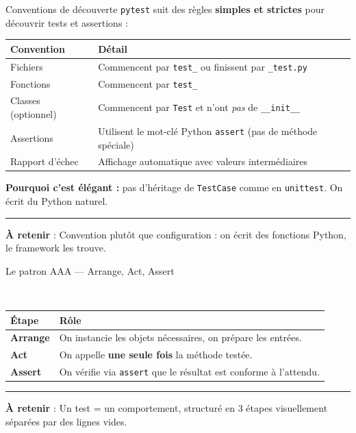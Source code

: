 \documentclass[aspectratio=169,11pt]{beamer}
\newcommand{\takeaway}[1]{%
\vfill\begin{beamercolorbox}[wd=\linewidth,sep=0.4em]{}
\color{accent2}\rule[0.6ex]{1.2em}{1.2pt}\hspace{0.4em}%
\textbf{\color{accent2}\small À retenir} \textcolor{textsoft}{:} %
{\small\color{textmain}#1}
\end{beamercolorbox}}
\begin{document}
\begin{frame}[t]{Conventions de découverte}
\footnotesize
\texttt{pytest} suit des règles \textbf{simples et strictes} pour découvrir tests et assertions :\\[0.3em]
\begin{tabular}{@{}p{4.4cm} p{8cm}@{}}
\toprule
\textbf{\color{accent}Convention} & \textbf{\color{accent}Détail} \\
\midrule
Fichiers & Commencent par \texttt{test\_} ou finissent par \texttt{\_test.py} \\
Fonctions & Commencent par \texttt{test\_} \\
Classes (optionnel) & Commencent par \texttt{Test} et n'ont \emph{pas} de \texttt{\_\_init\_\_} \\
Assertions & Utilisent le mot-clé Python \texttt{assert} (pas de méthode spéciale) \\
Rapport d'échec & Affichage automatique avec valeurs intermédiaires \\
\bottomrule
\end{tabular}
\vspace{0.4cm}
\textbf{Pourquoi c'est élégant :} pas d'héritage de \texttt{TestCase} comme en \texttt{unittest}. On écrit du Python naturel.
\takeaway{Convention plutôt que configuration : on écrit des fonctions Python, le framework les trouve.}
\end{frame}

\begin{frame}[t]{Le patron AAA --- Arrange, Act, Assert}
\centering
{}
\\
\vspace{0.8cm}
\footnotesize
\begin{tabular}{@{}p{1.7cm} p{10.5cm}@{}}
\toprule
\textbf{Étape} & \textbf{Rôle} \\
\midrule
\textbf{Arrange} & On instancie les objets nécessaires, on prépare les entrées. \\
\textbf{Act} & On appelle \textbf{une seule fois} la méthode testée. \\
\textbf{Assert} & On vérifie via \texttt{assert} que le résultat est conforme à l'attendu. \\
\bottomrule
\end{tabular}
\takeaway{Un test = un comportement, structuré en 3 étapes visuellement séparées par des lignes vides.}
\end{frame}
\end{document}
